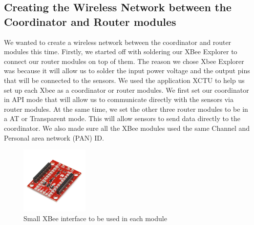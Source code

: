 \documentclass[a4paper,11pt]{report}
\begin{document}
	
	\subsection{Creating the Wireless Network between the Coordinator and Router modules}
	\par We wanted to create a wireless network between the coordinator and router modules this time. Firstly, we started off with soldering our XBee Explorer to connect our router modules on top of them. The reason we chose Xbee Explorer was because it will allow us to solder the input power voltage and the output pins that will be connected to the sensors. We used the application XCTU to help us set up each Xbee as a coordinator or router modules. We first set our coordinator in API mode that will allow us to communicate directly with the sensors via router modules. At the same time, we set the other three router modules to be in a AT or Transparent mode. This will allow sensors to send data directly to the coordinator. We also made sure all the XBee modules used the same Channel and Personal area network (PAN) ID. 
	\begin{figure}[h]
		\centering
		\includegraphics[width = 0.3\textwidth]{xbeeMiniExplorer.png}
		\caption{Small XBee interface to be used in each module}
	\end{figure}
\end{document}
